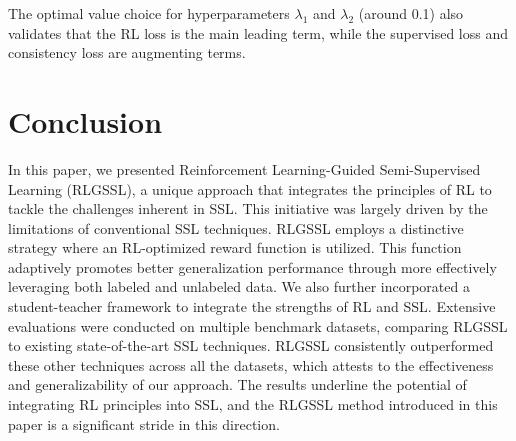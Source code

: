 The optimal value choice for hyperparameters $\lambda_1$ and $\lambda_2$ (around 0.1) 
also validates that the RL loss is the main leading term, while the supervised loss and consistency loss are augmenting terms. 



\section{Conclusion}
In this paper, we presented Reinforcement Learning-Guided Semi-Supervised Learning (RLGSSL), a unique approach that integrates the principles of RL to tackle the challenges inherent in SSL. 
This initiative was largely driven by the limitations of conventional SSL techniques. 
RLGSSL employs a distinctive strategy where an RL-optimized reward function is utilized. 
This function adaptively promotes better generalization performance through
more effectively leveraging both labeled and unlabeled data.
We also further incorporated a student-teacher framework to integrate the strengths of RL and SSL. 
Extensive evaluations were conducted on multiple benchmark datasets,
comparing RLGSSL to existing state-of-the-art SSL techniques. 
RLGSSL consistently outperformed these other techniques across all the datasets, which attests to the effectiveness and generalizability of our approach. The results underline the potential of integrating RL principles into SSL, and the RLGSSL method introduced in this paper is a significant stride in this direction. 







